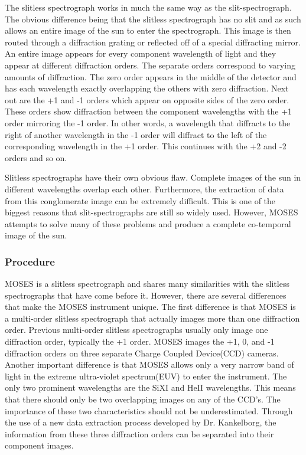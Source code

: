 \documentclass[11pt,titlepage]{article}
\begin{document}
The slitless spectrograph works in much the same way as the slit-spectrograph. The obvious difference being that the slitless spectrograph has no slit 
and as such allows an entire image of the sun to enter the spectrograph. This image is then routed through a diffraction grating or reflected off of a 
special diffracting mirror. An entire image appears for every component wavelength of light and they appear at different diffraction orders. The separate 
orders correspond to varying amounts of diffraction. The zero order appears in the middle of the detector and has each wavelength exactly overlapping the
others with zero diffraction. Next out are the +1 and -1 orders which appear on opposite sides of the zero order. These orders show diffraction between
the component wavelengths with the +1 order mirroring the -1 order. In other words, a wavelength that diffracts to the right of another wavelength in the 
-1 order will diffract to the left of the corresponding wavelength in the +1 order. This continues with the +2 and -2 orders and so on.

Slitless spectrographs have their own obvious flaw. Complete images of the sun in different wavelengths overlap each other. Furthermore, the extraction
of data from this conglomerate image can be extremely difficult. This is one of the biggest reasons that slit-spectrographs are still so widely used. 
However, MOSES attempts to solve many of these problems and produce a complete co-temporal image of the sun.
 
\subsubsection{Procedure}

MOSES is a slitless spectrograph and shares many similarities with the slitless spectrographs that have come before it. However, there are several 
differences that make the MOSES instrument unique. The first difference is that MOSES is a multi-order slitless spectrograph that actually images more 
than one diffraction order. Previous multi-order slitless spectrographs usually only image one diffraction order, typically the +1 order. MOSES images
the +1, 0, and -1 diffraction orders on three separate Charge Coupled Device(CCD) cameras. Another important difference is that MOSES allows only a 
very narrow band of light
in the extreme ultra-violet spectrum(EUV) to enter the instrument. The only two prominent wavelengths are the SiXI and HeII wavelengths. This means 
that there should only be two overlapping images on any of the CCD's. The importance of these two characteristics should not be underestimated. 
Through the use of a new data extraction process developed by Dr. Kankelborg, the information from these three diffraction orders can be separated 
into their component images.
\end{document}
